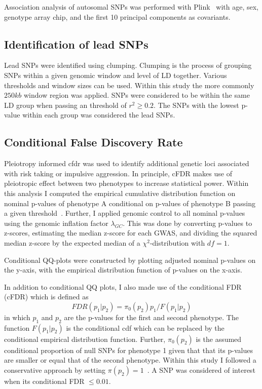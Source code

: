 Association analysis of autosomal SNPs was performed with Plink~\cite{Purcell2007,Chang2015} with age, sex, genotype array chip, and the first 10 principal components as covariants.

\subsection{Identification of lead SNPs}
\label{sub:Clumping}

Lead SNPs were identified using clumping.
Clumping is the process of grouping SNPs within a given genomic window and level of LD together.
Various thresholds and window sizes can be used.
Within this study the more commonly $250kb$ window region was applied.
SNPs were considered to be within the same LD group when passing an threshold of $r^2 \ge 0.2$.
The SNPs with the lowest p-value within each group was considered the lead SNPs.

\subsection{Conditional False Discovery Rate}
\label{sub:conditional_false_discovery_rate}

Pleiotropy informed \acrfull{cfdr} was used to identify additional genetic loci associated with risk taking or impulsive aggression. 
In principle, cFDR makes use of pleiotropic effect between two phenotypes to increase statistical power.
Within this analysis I computed the empirical cumulative distribution function on nominal p-values of phenotype A conditional on p-values of phenotype B passing a given threshold~\cite{Andreassen2013}.
Further, I applied genomic control to all nominal p-values using the genomic inflation factor $\lambda_{GC}$.
This was done by converting p-values to z-scores, estimating the median z-score for each GWAS, and dividing the squared median z-score by the expected median of a $\chi^2$-distribution  with $df=1$.

Conditional QQ-plots were constructed by plotting adjusted nominal p-values on the y-axis, with the empirical distribution function of p-values on the x-axis.

In addition to conditional QQ plots, I also made use of the conditional FDR (cFDR) which is defined as~\cite{Andreassen2013}
\begin{equation}
  FDR(p_1|p_2)=\pi_0(p_2)p_1/F(p_1|p_2)
\end{equation}
in which $p_1$ and $p_2$ are the p-values for the first and second phenotype.
The function $F(p_1|p_2)$ is the conditional cdf which can be replaced by the conditional empirical distribution function.
Further, $\pi_0(p_2)$ is the assumed conditional proportion of null SNPs for phenotype 1 given that that its p-values are smaller or equal that of the second phenotype.
Within this study I followed a conservative approach by setting $\pi(p_2)=1$~\cite{Andreassen2013}.
A SNP was considered of interest when its conditional FDR $\leq 0.01$.

